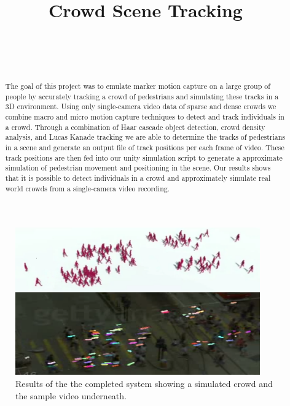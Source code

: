 \documentclass[12pt, onecolumn, conference]{IEEEtran}
\begin{document}
 
\title{Crowd Scene Tracking}

\author{
\\
\and
{}
\\
}

\maketitle

\begin{abstract}
The goal of this project was to emulate marker motion capture on a large group of people by accurately tracking a crowd of pedestrians and simulating these tracks in a 3D environment. Using only single-camera video data of sparse and dense crowds we combine macro and micro motion capture techniques to detect and track individuals in a crowd. Through a combination of Haar cascade object detection, crowd density analysis, and Lucas Kanade tracking  we are able to determine the tracks of pedestrians in a scene and  generate an output file of track positions per each frame of video. These track positions are then fed into our unity simulation script to generate a approximate simulation of pedestrian movement and positioning in the scene. Our results shows that it is possible to detect individuals in a crowd and approximately simulate real world crowds from a single-camera video recording. 

\end{abstract}

\begin{figure}[!b]
\centering
\includegraphics[height=2.5in]{Screenshots/compairsion.png}
\caption{Results of the the completed system showing a simulated crowd and the sample video underneath. }
\label{Compairsion}
\end{figure}
\end{document}
